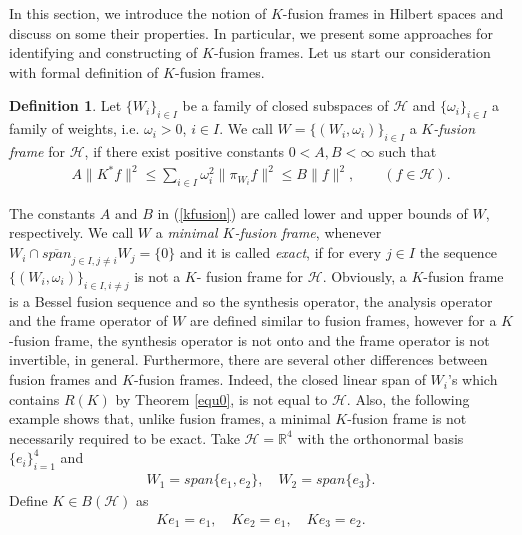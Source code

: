 \documentclass{birkjour}
\theoremstyle{definition}
\newtheorem{defn}[thm]{Definition}
\theoremstyle{remark}
\numberwithin{equation}{section}
\begin{document}
\smallskip
\goodbreak

In this section, we introduce the notion of $K$-fusion frames
in Hilbert spaces and discuss on some their properties. In particular, we present some
approaches for identifying and constructing of $K$-fusion frames. Let us start our consideration with formal definition of $K$-fusion frames.
\begin{defn}\label{kfusion5} Let $\lbrace W_{i}\rbrace_{i\in I}$ be a family
of closed subspaces of $\mathcal{H}$ and $\{\omega_i\}_{i\in I}$   a family
of weights, i.e. $\omega_i>0$, $i\in I$. We call
$W=\lbrace(W_{i},\omega_{i})\rbrace_{i\in I}$ a \textit{$K$-fusion frame} for
$\mathcal{H}$, if there exist positive constants $0 < A, B < \infty$ such
that
\begin{eqnarray}\label{kfusion} A\|K^{*}f\|^{2}\leq \sum_{i\in
I}\omega_i^2\|\pi_{W_i}f\|^2\leq B\|f\|^{2},\qquad (f\in \mathcal{H}).
\end{eqnarray} \end{defn}
The constants $A$ and $B$ in (\ref{kfusion}) are called  lower and
upper bounds of $W$, respectively.
We call $W$ a \textit{minimal $K$-fusion frame}, whenever $W_{i}\cap \overline{span}_{j\in I, j\neq i}W_{j} = \{0\}$  and it is called \textit{exact}, if  for every $j\in I$ the sequence $\lbrace (W_{i},\omega_{i})\rbrace_{i\in I, i\neq j}$ is not a $K$- fusion frame for $\mathcal{H}$.
Obviously, a $K$-fusion frame is a Bessel fusion sequence
and so the synthesis operator, the analysis operator and the frame operator
of $W$ are defined similar to fusion frames, however  for a  $K$-fusion frame, the synthesis operator  is not onto and the frame
operator is not invertible, in general. Furthermore, there are several other differences between fusion frames and $K$-fusion frames. Indeed,  the closed linear span of  $W_{i}$'s which contains $R(K)$ by Theorem \ref{equ0}, is not equal to $\mathcal{H}$.  Also, the following example  shows that,  unlike fusion frames, a minimal $K$-fusion frame  is not necessarily
required to be exact. Take $\mathcal{H} = \mathbb{R}^{4}$ with the orthonormal basis $\{e_{i}\}_{i=1}^{4}$ and
\begin{eqnarray*}
W_{1} = span\{e_{1},e_{2}\} , \quad W_{2} = span\{e_{3}\}.
 \end{eqnarray*}
Define $K\in B(\mathcal{H})$ as
\begin{eqnarray*}
Ke_{1} = e_{1}, \quad Ke_{2} = e_{1}, \quad Ke_{3} = e_{2}.
 \end{eqnarray*}
\end{document}
